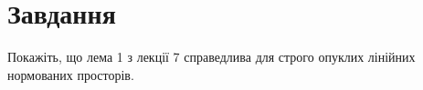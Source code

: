 
\chapter{Завдання \theHchapter}

\begin{tcolorbox}[title=Завдання]
    Покажіть, що лема 1 з лекції 7 справедлива для строго 
    опуклих лінійних нормованих просторів.
\end{tcolorbox}

